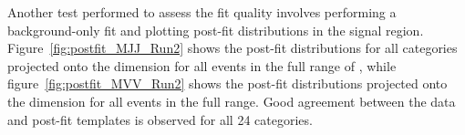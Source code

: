 Another test performed to assess the fit quality involves performing a background-only fit and plotting post-fit distributions in the signal region.
Figure~\ref{fig:postfit_MJJ_Run2} shows the post-fit distributions for all categories projected onto the \MJ dimension for all events in the full range of \MVV, while figure~\ref{fig:postfit_MVV_Run2} shows the post-fit distributions projected onto the \MVV dimension for all events in the full \MJ range.
Good agreement between the data and post-fit templates is observed for all 24 categories.

